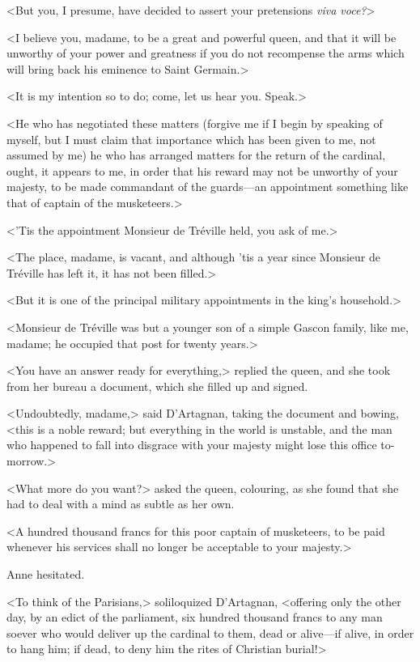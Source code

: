 <But you, I presume, have decided to assert your pretensions \textit{viva voce?}>

<I believe you, madame, to be a great and powerful queen, and that it will be unworthy of your power and greatness if you do not recompense the arms which will bring back his eminence to Saint Germain.>

<It is my intention so to do; come, let us hear you. Speak.>

<He who has negotiated these matters (forgive me if I begin by speaking of myself, but I must claim that importance which has been given to me, not assumed by me) he who has arranged matters for the return of the cardinal, ought, it appears to me, in order that his reward may not be unworthy of your majesty, to be made commandant of the guards—an appointment something like that of captain of the musketeers.>

<'Tis the appointment Monsieur de Tréville held, you ask of me.>

<The place, madame, is vacant, and although 'tis a year since Monsieur de Tréville has left it, it has not been filled.>

<But it is one of the principal military appointments in the king's household.>

<Monsieur de Tréville was but a younger son of a simple Gascon family, like me, madame; he occupied that post for twenty years.>

<You have an answer ready for everything,> replied the queen, and she took from her bureau a document, which she filled up and signed.

<Undoubtedly, madame,> said D'Artagnan, taking the document and bowing, <this is a noble reward; but everything in the world is unstable, and the man who happened to fall into disgrace with your majesty might lose this office to-morrow.>

<What more do you want?> asked the queen, colouring, as she found that she had to deal with a mind as subtle as her own.

<A hundred thousand francs for this poor captain of musketeers, to be paid whenever his services shall no longer be acceptable to your majesty.>

Anne hesitated.

<To think of the Parisians,> soliloquized D'Artagnan, <offering only the other day, by an edict of the parliament, six hundred thousand francs to any man soever who would deliver up the cardinal to them, dead or alive—if alive, in order to hang him; if dead, to deny him the rites of Christian burial!>

